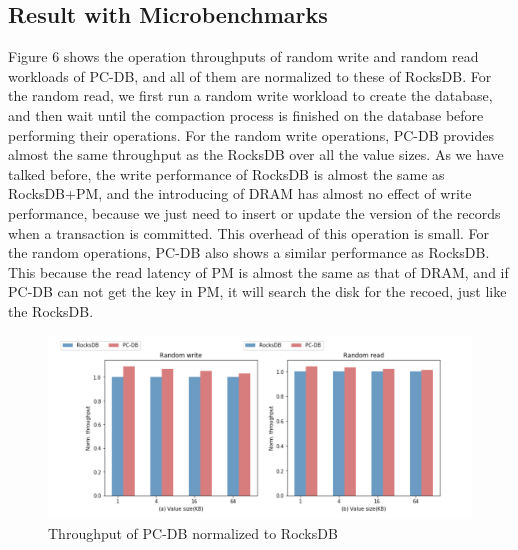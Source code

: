 \subsection{Result with Microbenchmarks}
Figure 6 shows the operation throughputs of random write and random read workloads of PC-DB, and all of them are normalized to these of RocksDB.  For the random read, we first run a random write workload to create the database, and then wait until the compaction process is finished on the database before performing their operations.
For the random write operations, PC-DB provides almost the same throughput as the RocksDB over all the value sizes. As we have talked before, the write performance of RocksDB is almost the same as RocksDB+PM, and the introducing of DRAM has almost no effect of write performance, because we just need to insert or update the version of the records when a transaction is committed. This overhead of this operation is small. 
For the random operations, PC-DB also shows a similar performance as RocksDB. This because the read latency of PM is almost the same as that of DRAM, and if PC-DB can not get the key in PM, it will search the disk for the recoed, just like the RocksDB.
\begin{figure}
    \centering
    \includegraphics[width=0.36\paperwidth]{USENIX/figure/Throughput.png}
    \caption{Throughput of PC-DB normalized to RocksDB}
    \label{fig:throughput}
\end{figure}
